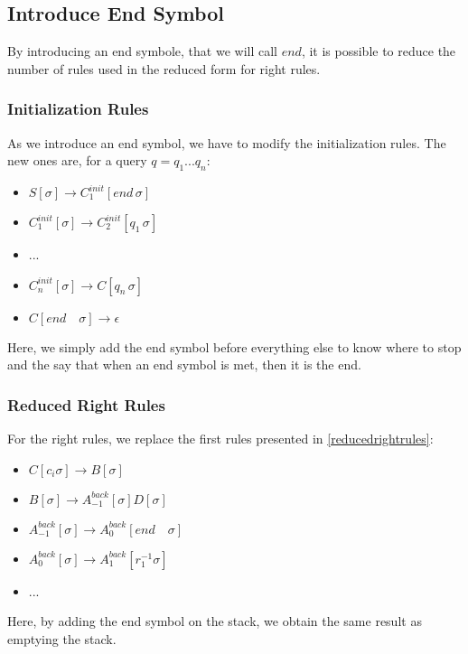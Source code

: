 \documentclass[10pt,a4paper,draft]{article}
\begin{document}
\subsection{Introduce End Symbol}

By introducing an end symbole, that we will call $end$, it is possible to reduce the number of rules used in the reduced form for right rules.

\subsubsection{Initialization Rules}

As we introduce an end symbol, we have to modify the initialization rules. The new ones are, for a query $q=q_1...q_n$:

\begin{itemize}
\item $S[\sigma] \rightarrow C_1^{init}[end \, \sigma]$
\item $C_1^{init}[\sigma] \rightarrow C_2^{init}[q_1 \, \sigma]$
\item ...
\item $C_n^{init}[\sigma] \rightarrow C[q_n \, \sigma]$
\item $C[end \quad \sigma] \rightarrow \epsilon$
\end{itemize}

Here, we simply add the end symbol before everything else to know where to stop and the say that when an end symbol is met, then it is the end.

\subsubsection{Reduced Right Rules}

For the right rules, we replace the first rules presented in \ref{reducedrightrules}:

\begin{itemize}
\item $C[c_i \sigma] \rightarrow B[\sigma]$
\item $B[\sigma] \rightarrow A^{back}_{-1}[\sigma] D[\sigma]$
\item $A^{back}_{-1}[\sigma] \rightarrow A^{back}_{0}[end \quad \sigma]$
\item $A^{back}_{0}[\sigma] \rightarrow A^{back}_{1}[r_1^{-1} \sigma]$
\item ...
\end{itemize}

Here, by adding the end symbol on the stack, we obtain the same result as emptying the stack.
\end{document}
